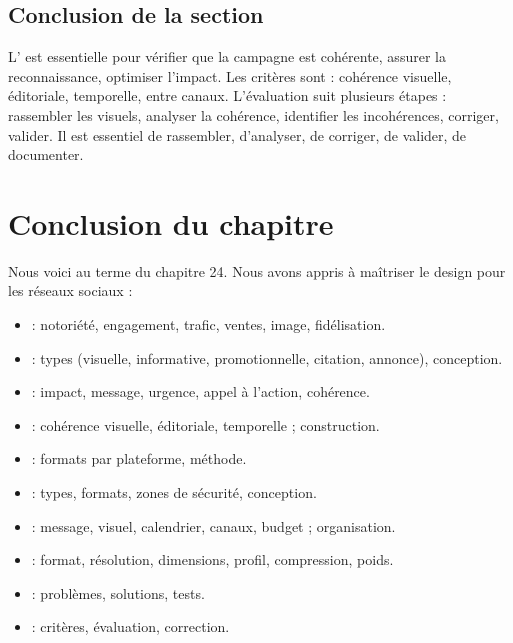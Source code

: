 \subsection*{Conclusion de la section}

L' est essentielle pour vérifier que la campagne est cohérente, assurer la reconnaissance, optimiser l'impact. Les critères sont : cohérence visuelle, éditoriale, temporelle, entre canaux. L'évaluation suit plusieurs étapes : rassembler les visuels, analyser la cohérence, identifier les incohérences, corriger, valider. Il est essentiel de rassembler, d'analyser, de corriger, de valider, de documenter.

\section*{Conclusion du chapitre}

Nous voici au terme du chapitre 24. Nous avons appris à maîtriser le design pour les réseaux sociaux :

\begin{itemize}
    \item {} : notoriété, engagement, trafic, ventes, image, fidélisation.
    \item {} : types (visuelle, informative, promotionnelle, citation, annonce), conception.
    \item {} : impact, message, urgence, appel à l'action, cohérence.
    \item {} : cohérence visuelle, éditoriale, temporelle ; construction.
    \item {} : formats par plateforme, méthode.
    \item {} : types, formats, zones de sécurité, conception.
    \item {} : message, visuel, calendrier, canaux, budget ; organisation.
    \item {} : format, résolution, dimensions, profil, compression, poids.
    \item {} : problèmes, solutions, tests.
    \item {} : critères, évaluation, correction.
\end{itemize}

